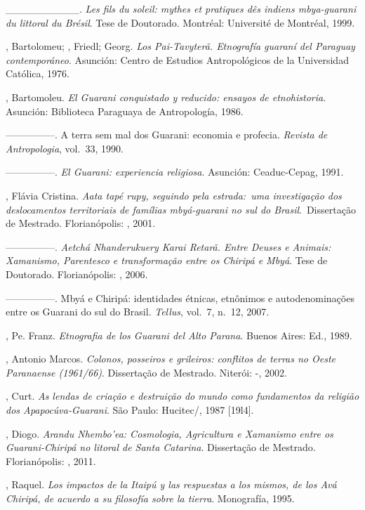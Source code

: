{{\begin{Parskip}
\_\_\_\_\_\_\_\_\_\_. \emph{Les fils du soleil: mythes et pratiques dês
indiens mbya-guarani du littoral du Brésil}. Tese de Doutorado.
Montréal: Université de Montréal, 1999.

, Bartolomeu; , Friedl;  Georg. \emph{Los Pai-Tavyterã.
Etnografía guaraní del Paraguay contemporáneo}. Asunción: Centro de
Estudios Antropológicos de la Universidad Católica, 1976.

, Bartomoleu. \emph{El Guarani conquistado y reducido: ensayos de
etnohistoria}. Asunción: Biblioteca Paraguaya de Antropología, 1986.

—————. A terra sem mal dos Guarani: economia e profecia. \emph{Revista de
Antropologia}, vol.~33, 1990. 

—————. \emph{El Guarani: experiencia religiosa}. Asunción: Ceaduc-Cepag, 1991.

, Flávia Cristina. \emph{Aata tapé rupy, seguindo pela estrada:~uma
investigação dos deslocamentos territoriais de famílias mbyá-guarani no
sul do Brasil}.~Dissertação de Mestrado. Florianópolis: , 2001.

—————. \emph{Aetchá Nhanderukuery Karai Retarã. Entre Deuses e Animais:
Xamanismo, Parentesco e transformação entre os Chiripá e Mbyá}. Tese de
Doutorado. Florianópolis: , 2006. 

—————. Mbyá e Chiripá: identidades étnicas, etnônimos e autodenominações
entre os Guarani do sul do Brasil. \emph{Tellus}, vol.~7, n.~12, 2007.

, Pe. Franz. \emph{Etnografia de los Guarani del Alto Parana}. Buenos
Aires:  Ed., 1989.

, Antonio Marcos. \emph{Colonos, posseiros e grileiros: conflitos de
terras no Oeste Paranaense (1961/66)}. Dissertação de Mestrado. Niterói:
-, 2002.

, Curt.  \emph{As lendas de criação e destruição do mundo como
fundamentos da religião dos Apapocúva-Guarani}. São Paulo: Hucitec/,
1987 [19l4].

, Diogo. \emph{Arandu Nhembo’ea: Cosmologia, Agricultura e Xamanismo
entre os Guarani-Chiripá no litoral de Santa Catarina}. Dissertação de
Mestrado. Florianópolis: , 2011.

, Raquel. \emph{Los impactos de la Itaipú y las respuestas a los
mismos, de los Avá Chiripá, de acuerdo a su filosofía sobre la tierra}.
Monografía, 1995.


\end{Parskip}}}

